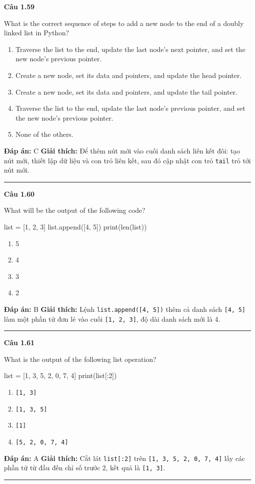 \documentclass[11pt,a4paper]{article}
\newenvironment{question}[1]{%
  \par\vspace{1em}\noindent\textbf{\large Câu #1}\par\vspace{0.4em}
}{%
  \par\vspace{1em}\hrule\vspace{0.6em}
}
\newenvironment{choices}{%
  \begin{enumerate}[label=\textbf{\Alph*.},leftmargin=2.2em,itemsep=2pt,topsep=3pt]
}{%
  \end{enumerate}
}
\newcommand{\choice}{\item}
\newenvironment{codebox}{%
  \begin{tcolorbox}[colback=gray!8!white,colframe=gray!50!black,arc=1.5mm,boxrule=0.6pt,left=3mm,right=3mm,top=2.5mm,bottom=2.5mm]
  \ttfamily\small
}{%
  \end{tcolorbox}
}
\begin{document}
\begin{question}{1.59}
What is the correct sequence of steps to add a new node to the end of a doubly linked list in Python?
\begin{choices}
\choice Traverse the list to the end, update the last node's next pointer, and set the new node's previous pointer.
\choice Create a new node, set its data and pointers, and update the head pointer.
\choice Create a new node, set its data and pointers, and update the tail pointer.
\choice Traverse the list to the end, update the last node's previous pointer, and set the new node's previous pointer.
\choice None of the others.
\end{choices}
\textbf{Đáp án:} C
\textbf{Giải thích:} Để thêm nút mới vào cuối danh sách liên kết đôi: tạo nút mới, thiết lập dữ liệu và con trỏ liên kết, sau đó cập nhật con trỏ \texttt{tail} trỏ tới nút mới.
\end{question}

\begin{question}{1.60}
What will be the output of the following code?
\begin{codebox}
list = [1, 2, 3]
list.append([4, 5])
print(len(list))
\end{codebox}
\begin{choices}
\choice 5
\choice 4
\choice 3
\choice 2
\end{choices}
\textbf{Đáp án:} B
\textbf{Giải thích:} Lệnh \texttt{list.append([4, 5])} thêm cả danh sách \texttt{[4, 5]} làm một phần tử đơn lẻ vào cuối \texttt{[1, 2, 3]}, độ dài danh sách mới là 4.
\end{question}

\begin{question}{1.61}
What is the output of the following list operation?
\begin{codebox}
list = [1, 3, 5, 2, 0, 7, 4]
print(list[:2])
\end{codebox}
\begin{choices}
\choice \texttt{[1, 3]}
\choice \texttt{[1, 3, 5]}
\choice \texttt{[1]}
\choice \texttt{[5, 2, 0, 7, 4]}
\end{choices}
\textbf{Đáp án:} A
\textbf{Giải thích:} Cắt lát \texttt{list[:2]} trên \texttt{[1, 3, 5, 2, 0, 7, 4]} lấy các phần tử từ đầu đến chỉ số trước 2, kết quả là \texttt{[1, 3]}.
\end{question}
\end{document}
